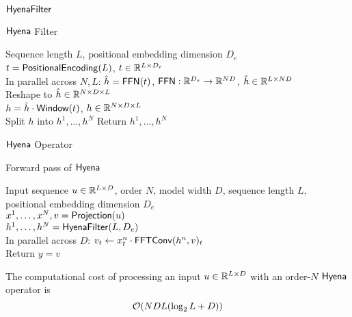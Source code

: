 \setcounter{algorithm}{0}
\begin{algorithm}[h]
    \caption{${\sf HyenaFilter}$}\label{alg:hyenaa}
    \caption{${\sf Hyena}$ Filter}
    \begin{algorithmic}
    \REQUIRE Sequence length $L$, positional embedding dimension $D_e$ \\ 
     $t  = {\sf PositionalEncoding}(L)$, $t \in \mathbb{R}^{L \times D_e}$ \\
     In parallel across $N, L$: $\hat{h} = {\sf FFN}(t)$, ${\sf FFN}: \mathbb{R}^{D_e}\rightarrow \mathbb{R}^{N D}$, $\hat{h} \in \mathbb{R}^{L \times N D}$\\
     Reshape to $\hat{h} \in \mathbb{R}^{N \times D \times L}$ \\
     $h = \hat{h} \cdot {\sf Window}(t)$, $h \in \mathbb{R}^{N \times D \times L}$ \\
     Split $h$ into $h^1, \dots, h^N$
    \STATE Return $h^1, \dots, h^N$
    \end{algorithmic}
\end{algorithm}

\setcounter{algorithm}{1}
\begin{algorithm}[h]
    \caption{${\sf Hyena}$ Operator}\label{alg:hyenaa}
    \caption{Forward pass of ${\sf Hyena}$}
    \begin{algorithmic}
    \REQUIRE Input sequence $u \in \mathbb{R}^{L \times D}$, order $N$, model width $D$, sequence length $L$, positional embedding dimension $D_e$ \\ 
     $x^1, \dots, x^N, v = {\sf Projection}(u)$ \\
     $h^1, \dots, h^N = {\sf HyenaFilter}(L, D_e)$ \\
     In parallel across $D$: $v_{t} \leftarrow x^n_{t}\cdot {\sf FFTConv}(h^n, v)_{t}$ \\
    \ENDFOR  
    \STATE Return $y = v$
    \end{algorithmic}
\end{algorithm}

%
\begin{proposition}
    The computational cost of processing an input $u\in\mathbb{R}^{L\times D}$ with an order-$N$ $\sf Hyena$ operator is
    \[
        \mathcal{O}(N D L(\log_2 L + D))
    \]
\end{proposition}
%
